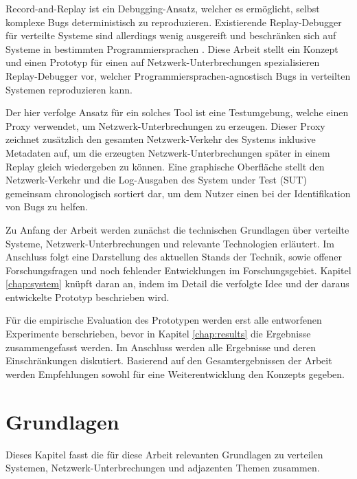 \documentclass[12pt,a4paper]{report}
\begin{document}

Record-and-Replay ist ein Debugging-Ansatz, welcher es ermöglicht, selbst komplexe Bugs deterministisch zu reproduzieren.
Existierende Replay-Debugger für verteilte Systeme sind allerdings wenig ausgereift und beschränken sich auf Systeme in bestimmten
Programmiersprachen \cite{distributed_replay_debugging_1997,distributed_replay_debugging_2006}. Diese Arbeit stellt ein Konzept
und einen Prototyp für einen auf Netzwerk-Unterbrechungen spezialisieren Replay-Debugger vor, welcher
Programmiersprachen-agnostisch Bugs in verteilten Systemen reproduzieren kann.


Der hier verfolge Ansatz für ein solches Tool ist eine Testumgebung, welche einen Proxy verwendet, um Netzwerk-Unterbrechungen zu
erzeugen. Dieser Proxy zeichnet zusätzlich den gesamten Netzwerk-Verkehr des Systems inklusive Metadaten auf, um die erzeugten
Netzwerk-Unterbrechungen später in einem Replay gleich wiedergeben zu können. Eine graphische Oberfläche stellt den
Netzwerk-Verkehr und die Log-Ausgaben des System under Test (SUT) gemeinsam chronologisch sortiert dar, um dem Nutzer einen bei
der Identifikation von Bugs zu helfen.

Zu Anfang der Arbeit werden zunächst die technischen Grundlagen über verteilte Systeme, Netzwerk-Unterbrechungen und relevante
Technologien erläutert. Im Anschluss folgt eine Darstellung des aktuellen Stands der Technik, sowie offener Forschungsfragen und
noch fehlender Entwicklungen im Forschungsgebiet. Kapitel \ref{chap:system} knüpft daran an, indem im Detail die verfolgte Idee
und der daraus entwickelte Prototyp beschrieben wird.

Für die empirische Evaluation des Prototypen werden erst alle entworfenen Experimente berschrieben, bevor in Kapitel
\ref{chap:results} die Ergebnisse zusammengefasst werden. Im Anschluss werden alle Ergebnisse und deren Einschränkungen
diskutiert. Basierend auf den Gesamtergebnissen der Arbeit werden Empfehlungen sowohl für eine Weiterentwicklung den Konzepts
gegeben.

\chapter{Grundlagen}
Dieses Kapitel fasst die für diese Arbeit relevanten Grundlagen zu verteilen Systemen, Netzwerk-Unterbrechungen und adjazenten
Themen zusammen.
\end{document}

